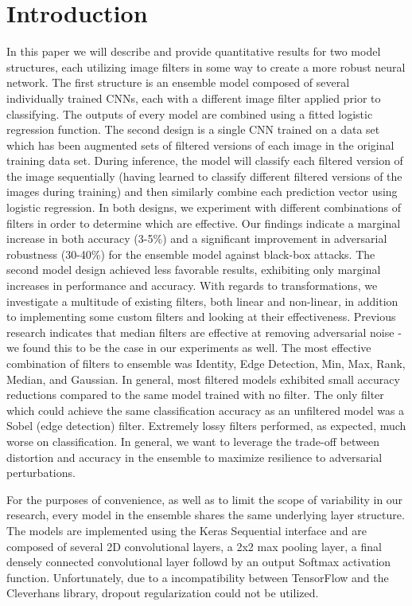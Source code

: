 \section{Introduction} \label{s:introduction}
In this paper we will describe and provide quantitative results for two model structures, each utilizing image filters in some way to create a more robust neural network.
The first structure is an ensemble model composed of several individually trained CNNs, each with a different image filter applied prior to classifying.
The outputs of every model are combined using a fitted logistic regression function.
The second design is a single CNN trained on a data set which has been augmented sets of filtered versions of each image in the original training data set.
During inference, the model will classify each filtered version of the image sequentially (having learned to classify different filtered versions of the images during training) and then similarly combine each prediction vector using logistic regression.
In both designs, we experiment with different combinations of filters in order to determine which are effective.
Our findings indicate a marginal increase in both accuracy (3-5\%) and a significant improvement in adversarial robustness (30-40\%) for the ensemble model against black-box attacks.
The second model design achieved less favorable results, exhibiting only marginal increases in performance and accuracy.
With regards to transformations, we investigate a multitude of existing filters, both linear and non-linear, in addition to implementing some custom filters and looking at their effectiveness.
Previous research indicates that median filters are effective at removing adversarial noise\cite{osadchy2016} - we found this to be the case in our experiments as well.
The most effective combination of filters to ensemble was Identity, Edge Detection, Min, Max, Rank, Median, and Gaussian.
In general, most filtered models exhibited small accuracy reductions compared to the same model trained with no filter.
The only filter which could achieve the same classification accuracy as an unfiltered model was a Sobel (edge detection) filter.
Extremely lossy filters performed, as expected, much worse on classification.
In general, we want to leverage the trade-off between distortion and accuracy in the ensemble to maximize resilience to adversarial perturbations.

For the purposes of convenience, as well as to limit the scope of variability in our research, every model in the ensemble shares the same underlying layer structure.
The models are implemented using the Keras Sequential interface and are composed of several 2D convolutional layers, a 2x2 max pooling layer, a final densely connected convolutional layer followd by an output Softmax activation function.
Unfortunately, due to a incompatibility between TensorFlow and the Cleverhans library, dropout regularization could not be utilized.
